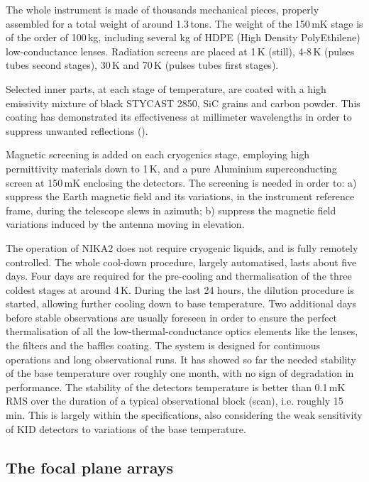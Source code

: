 \documentclass[]{aa} %
\begin{document}
The whole instrument is made of thousands mechanical pieces, properly assembled for a total weight of around 1.3\,tons. The weight of the 150\,mK stage is of the order of 100\,kg, including several kg of HDPE (High Density PolyEthilene) low-conductance lenses. Radiation screens are placed at 1\,K (still), 4-8\,K (pulses tubes second stages), 30\,K and 70\,K (pulses tubes first stages).

Selected inner parts, at each stage of temperature, are coated with a high emissivity mixture of black STYCAST 2850, SiC grains and carbon powder. This coating has demonstrated its effectiveness at millimeter wavelengths in order to suppress unwanted reflections (\cite{Calvo2010}).

Magnetic screening is added on each cryogenics stage, employing high permittivity materials down to 1\,K, and a pure Aluminium superconducting screen at 150\,mK enclosing the detectors. The screening is needed in order to: a) suppress the Earth magnetic field and its variations, in the instrument reference frame, during the telescope slews in azimuth; b) suppress the magnetic field variations induced by the antenna moving in elevation. 

The operation of NIKA2 does not require cryogenic liquids, and is fully remotely controlled. The whole cool-down procedure, largely automatised, lasts about five days. Four days are required for the pre-cooling and thermalisation of the three coldest stages at around 4\,K. During the last 24 hours, the dilution procedure is started, allowing further cooling down to base temperature. Two additional days before stable observations are usually foreseen in order to ensure the perfect thermalisation of all the low-thermal-conductance optics elements like the lenses, the filters and the baffles coating. The system is designed for continuous operations and long observational runs. It has showed so far the needed stability of the base temperature over roughly one month, with no sign of degradation in performance. The stability of the detectors temperature is better than 0.1\,mK RMS over the duration of a typical observational block (scan), i.e. roughly 15\,min. This is largely within the specifications, also considering the weak sensitivity of KID detectors to variations of the base temperature. 


 \subsection{The focal plane arrays}
\end{document}
